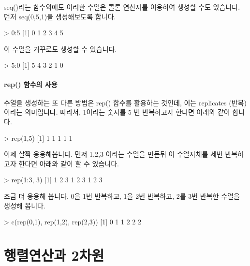 \documentclass{book}
\begin{document}
seq()라는 함수외에도 이러한 수열은 콜론 연산자를 이용하여 생성할 수도 있습니다. 
먼저 seq(0,5,1)을 생성해보도록 합니다. 

\begin{Schunk}
\begin{Soutput}
> 0:5
[1] 0 1 2 3 4 5
\end{Soutput}
\end{Schunk}

이 수열을 거꾸로도 생성할 수 있습니다. 

\begin{Schunk}
\begin{Soutput}
> 5:0
[1] 5 4 3 2 1 0	
\end{Soutput}
\end{Schunk}

\paragraph{rep() 함수의 사용} 

수열을 생성하는 또 다른 방법은 rep() 함수를 활용하는 것인데, 이는 replicates (반복)이라는 의미입니다.
따라서, 1이라는 숫자를 5 번 반복하고자 한다면 아래와 같이 합니다. 

\begin{Schunk}
\begin{Soutput}
> rep(1,5)
[1] 1 1 1 1 1
\end{Soutput}
\end{Schunk}

이제 살짝 응용해봅니다.  
먼저 1,2,3 이라는 수열을 만든뒤 이 수열자체를 세번 반복하고자 한다면 아래와 같이 할 수 있습니다. 

\begin{Schunk}
\begin{Soutput}
> rep(1:3, 3)
[1] 1 2 3 1 2 3 1 2 3	
\end{Soutput}
\end{Schunk}

조금 더 응용해 봅니다. 
0을 1번 반복하고, 1을 2번 반복하고, 2를 3번 반복한 수열을 생성해 봅니다. 

\begin{Schunk}
\begin{Soutput}
> c(rep(0,1), rep(1,2), rep(2,3))
[1] 0 1 1 2 2 2
\end{Soutput}
\end{Schunk}


\section{행렬연산과 2차원}
\end{document}
